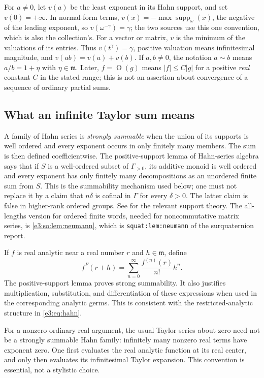 \documentclass[11pt,letterpaper]{article}
\numberwithin{equation}{section}
\theoremstyle{definition}
\theoremstyle{remark}
\newcommand{\mm}{\mathfrak m}
\newcommand{\supp}{\operatorname{supp}}
\newcommand{\smallO}{\operatorname{O}}
\begin{document}
For $a\ne0$, let $v(a)$ be the least exponent in its Hahn support, and set
$v(0)=+\infty$. In normal-form terms, $v(x)=-\max\supp_\omega(x)$, the
negative of the leading exponent, so $v(\omega^{-\gamma})=\gamma$; the two
sources use this one convention, which is also the collection's. For a vector
or matrix, $v$ is the minimum of the valuations of its entries. Thus
$v(t^\gamma)=\gamma$, positive valuation means
infinitesimal magnitude, and $v(ab)=v(a)+v(b)$. If $a,b\ne0$, the notation
$a\sim b$ means $a/b=1+\eta$ with $\eta\in\mm$. Later,
$f=\smallO(g)$ means $|f|\le C|g|$ for a positive \emph{real} constant $C$
in the stated range; this is not an assertion about convergence of a sequence
of ordinary partial sums.

\subsection{What an infinite Taylor sum means}

A family of Hahn series is \emph{strongly summable} when the union of its
supports is well ordered and every exponent occurs in only finitely many
members. The sum is then defined coefficientwise. The positive-support lemma
of Hahn-series algebra says that if $S$ is a well-ordered subset of
$\Gamma_{>0}$, its additive monoid is well ordered and every exponent has only
finitely many decompositions as an unordered finite sum from $S$.
This is the summability mechanism used below; one must not replace it by a
claim that $n\delta$ is cofinal in $\Gamma$ for every $\delta>0$.
The latter claim is false in higher-rank ordered groups. See
\cite{Neumann,vdDEErr} for the relevant support theory. The all-lengths
version for ordered finite words, needed for noncommutative matrix series, is
\cref{e3:so:lem:neumann}, which is \texttt{squat:lem:neumann} of the
surquaternion report.

If $f$ is real analytic near a real number $r$ and $h\in\mm$, define
\begin{equation}\label{e3:eq:taylor}
 f^F(r+h)=\sum_{n=0}^{\infty}\frac{f^{(n)}(r)}{n!}h^n.
\end{equation}
The positive-support lemma proves strong summability. It also justifies
multiplication, substitution, and differentiation of these expressions when
used in the corresponding analytic germs. This is consistent with the
restricted-analytic structure in \cref{e3:eq:hahn}.

For a nonzero ordinary real argument, the usual Taylor series about zero
need not be a strongly summable Hahn family: infinitely many nonzero real
terms have exponent zero. One first evaluates the real analytic function at
its real center, and only then evaluates its infinitesimal Taylor expansion.
This convention is essential, not a stylistic choice.
\end{document}
